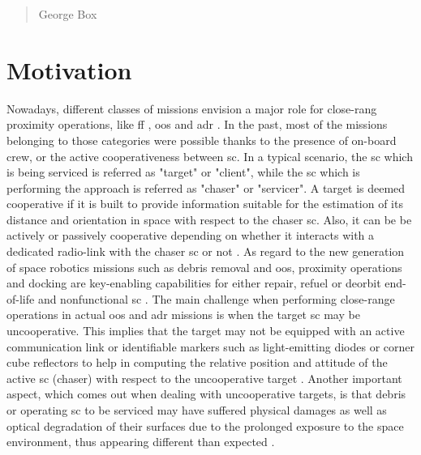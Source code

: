 \begin{quotation}
  {\footnotesize
    \begin{flushright}
      George Box
    \end{flushright}
  }
\end{quotation}
\vspace{0.5cm}

\section{Motivation}
Nowadays, different classes of missions envision a major role for close-rang proximity operations, like \acrfull{ff} \cite{2001FormationFliying}  \cite{2009FormationFliying}, \acrfull{oos} \cite{auricchio} \cite{Zimpfer2005} \cite{Tatsch2006} \cite{FloresAbad2014} and \acrfull{adr} \cite{clerc2012astrium} \cite{Bonnal2013}.
In the past, most of the missions belonging to those categories were possible thanks to the presence of on-board crew, or the active cooperativeness between \acrshort{sc}.
In a typical scenario, the \acrshort{sc} which is being serviced is referred as "target" or "client", while the \acrshort{sc} which is performing the approach is referred as "chaser" or "servicer". A target is deemed cooperative if it is built to provide information suitable for the estimation of its distance and orientation in space with respect to the chaser \acrshort{sc}. Also, it can be be actively or passively cooperative depending on whether it interacts with a dedicated radio-link with the chaser \acrshort{sc} or not \cite{Opromolla2017}.
As regard to the new generation of space robotics missions such as debris removal and \acrshort{oos}, proximity operations and docking are key-enabling capabilities for either repair, refuel or deorbit end-of-life and nonfunctional \acrshort{sc} \cite{2016Ventura}.
The main challenge when performing close-range operations in actual \acrshort{oos} and \acrshort{adr} missions is when the target \acrshort{sc} may be uncooperative.
This implies that the target may not be equipped with an active communication link or identifiable markers such as light-emitting diodes or corner cube reflectors to help in computing the relative position and attitude of the active \acrshort{sc} (chaser) with respect to the uncooperative target \cite{2019phdSharma}.
Another important aspect, which comes out when dealing with uncooperative targets, is that debris or operating \acrshort{sc} to be serviced may have suffered physical damages as well as optical degradation of their surfaces due to the prolonged exposure to the space environment, thus appearing different than expected \cite{Opromolla2017}.
